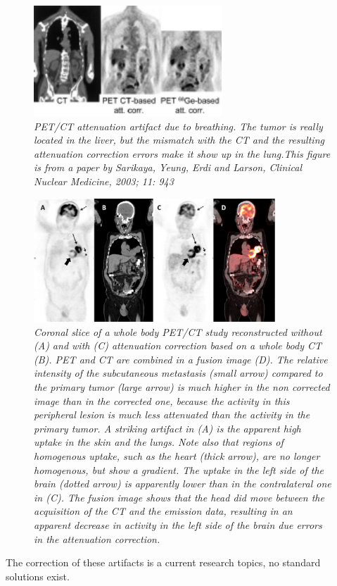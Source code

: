 %
\begin{figure}[tbp]
\centering
\includegraphics[width=0.63\textwidth]{figs/fig_petctbreathing.pdf}
\caption{\label{fig:petctbreathing} \emph{PET/CT attenuation artifact
due to breathing. The tumor is really located in the liver, but the
mismatch with the CT and the resulting attenuation correction errors
make it show up in the lung.This figure is from a paper by Sarikaya,
Yeung, Erdi and Larson, Clinical Nuclear Medicine, 2003; 11: 943}}
\end{figure}

\begin{figure}[tbp]
\centering
\includegraphics[width=0.81\textwidth]{figs/fig_petctatcor.pdf}
\caption{\label{fig:petctatcor} \emph{Coronal slice of a whole body
PET/CT study reconstructed without (A) and with (C) attenuation
correction based on a whole body CT (B). PET and CT are combined in a
fusion image (D). The relative intensity of the subcutaneous
metastasis (small arrow) compared to the primary tumor (large arrow)
is much higher in the non corrected image than in the corrected one,
because the activity in this peripheral lesion is much less attenuated
than the activity in the primary tumor. A striking artifact in (A) is
the apparent high uptake in the skin and the lungs. Note also that
regions of homogenous uptake, such as the heart (thick arrow), are no
longer homogenous, but show a gradient. The uptake in the left side of
the brain (dotted arrow) is apparently lower than in the contralateral
one in (C). The fusion image shows that the head did move between the
acquisition of the CT and the emission data, resulting in an apparent
decrease in activity in the left side of the brain due errors in the
attenuation correction.}}
\end{figure}

The correction of these artifacts is a current research topics, no standard
solutions exist.